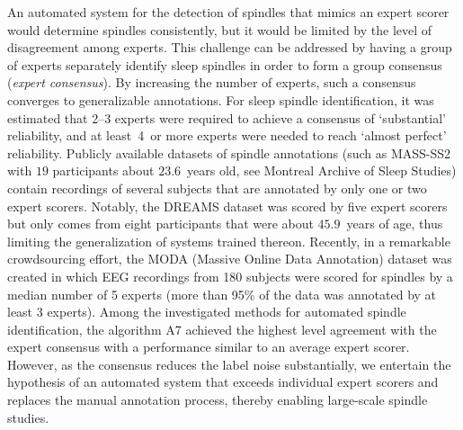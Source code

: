 \documentclass[fleqn,twocolumn,10pt]{wlscirep}
\begin{document}
An automated system for the detection of spindles that mimics an expert scorer
would determine spindles consistently, but it would be limited by the level of
disagreement among experts.
This challenge can be addressed
by having a group of experts separately identify sleep spindles in order to form a
group consensus (\emph{expert consensus})\cite{Wendt2015}.  By increasing the
number of experts, such a consensus converges to generalizable
annotations\cite{Kraemer1979}.
For sleep spindle identification, it was estimated that 2--3 experts were
required to achieve a consensus of `substantial' reliability, and at least~4~or
more experts were needed to reach `almost perfect' reliability\cite{Wendt2015}.
Publicly available datasets of spindle annotations (such as MASS-SS2 with $19$
participants about $23.6$~years old, see Montreal Archive of Sleep Studies\cite{OReilly2014}) contain recordings of
several subjects that are annotated by only one or two expert scorers.  Notably, the
DREAMS dataset\cite{Devuyst2006} was scored by five expert scorers but only comes from eight
participants that were about $45.9$~years of age\cite{Kulkarni2019}, thus limiting the
generalization of systems trained thereon.
Recently, in a remarkable crowdsourcing effort, the MODA (Massive Online
Data Annotation) dataset was created in which EEG recordings from 180 subjects
were scored for spindles by a median number of 5 experts (more than 95\% of the
data was annotated by at least 3 experts)\cite{Lacourse2020}.
Among the investigated methods for automated spindle identification, the
algorithm A7\cite{Lacourse2019} achieved the highest level agreement with the expert consensus
with a performance similar to an average expert scorer.
However, as the consensus reduces the label noise substantially,
we entertain the hypothesis of an automated system that exceeds individual
expert scorers and replaces the manual annotation process,
thereby enabling large-scale spindle studies.
\end{document}
